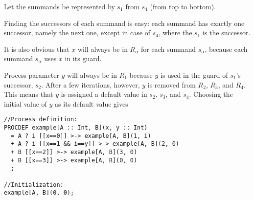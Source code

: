 Let the summands be represented by $s_1$ from $s_4$ (from top to bottom).

Finding the successors of each summand is easy: each summand has exactly one successor, namely the next one, except in case of $s_4$, where the $s_1$ is the successor.

It is also obvious that $x$ will always be in $R_\alpha$ for each summand $s_\alpha$, because each summand $s_\alpha$ uses $x$ in its guard.

Process parameter $y$ will always be in $R_1$ because $y$ is used in the guard of $s_1$'s successor, $s_2$.
After a few iterations, however, $y$ is removed from $R_2$, $R_3$, and $R_4$.
This means that $y$ is assigned a default value in $s_2$, $s_3$, and $s_4$.
Choosing the initial value of $y$ as its default value gives

\begin{lstlisting}
//Process definition:
PROCDEF example[A :: Int, B](x, y :: Int)
  = A ? i [[x==0]] >-> example[A, B](1, i)
  + A ? i [[x==1 && i==y]] >-> example[A, B](2, 0)
  + B [[x==2]] >-> example[A, B](3, 0)
  + B [[x==3]] >-> example[A, B](0, 0)
  ;

//Initialization:
example[A, B](0, 0);
\end{lstlisting}




